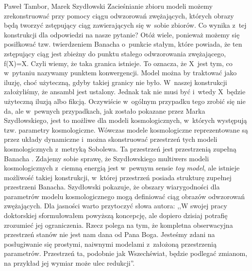 \begin{artplenv2auth}{Paweł Tambor, Marek Szydłowski}
Zacieśnianie zbioru modeli możemy zrekonstruować przy pomocy ciągu odwzorowań zwężających, których obrazy będą tworzyć zstępujący ciąg zawierających się w~sobie zbiorów. Co wynika z~tej konstrukcji dla odpowiedzi na nasze pytanie? Otóż wiele, ponieważ możemy się posiłkować tzw. twierdzeniem Banacha o~punkcie stałym, które powiada, że ten zstępujący ciąg jest zbieżny do punktu stałego odwzorowania zwężającego, f(X)=X. Czyli wiemy, że taka granica istnieje. To oznacza, że X~jest tym, co w~pytaniu nazywamy punktem konwergencji. Model można by traktować jako iluzję, choć użyteczną, gdyby takiej granicy nie było. W~naszej konstrukcji założyliśmy, że ansambl jest ustalony. Jednak tak nie musi być i~wtedy X~będzie użyteczną iluzją albo fikcją. Oczywiście w~ogólnym przypadku tego zrobić się nie da, ale w~pewnych przypadkach, jak zostało pokazane przez Marka Szydłowskiego, jest to możliwe dla modeli kosmologicznych, w~których występują tzw. parametry kosmologiczne. Wówczas modele kosmologiczne reprezentowane są przez układy dynamiczne i~można skonstruować przestrzeń tych modeli kosmologicznych z~metryką Sobolewa. Ta przestrzeń jest przestrzenią zupełną Banacha
\parencite[][]{szydlowski_cosmological_2007}. %
 Zdajemy sobie sprawę, że Szydłowskiego multiwers modeli kosmologicznych z~ciemną energią jest w~pewnym sensie \textit{toy model}, ale istnieje możliwość takiej konstrukcji, w~której przestrzeń posiada strukturę zupełnej przestrzeni Banacha. Szydłowski pokazuje, że obszary wiarygodności dla parametrów modelu kosmologicznego mogą definiować ciąg obrazów odwzorowań zwężających. Dla jasności warto przytoczyć słowa autora: ,,W swojej pracy doktorskiej sformułowałem powyższą koncepcję, ale dopiero dzisiaj potrafię zrozumieć jej ograniczenia. Rzecz polega na tym, że kompletna obserwacyjna przestrzeń stanów nie jest nam dana od Pana Boga. Jesteśmy zdani na posługiwanie się prostymi, naiwnymi modelami z~założoną przestrzenią parametrów. Przestrzeń ta, podobnie jak Wszechświat, będzie podlegać zmianom, na przykład jej wymiar może ulec redukcji''.


\end{artplenv2auth}
